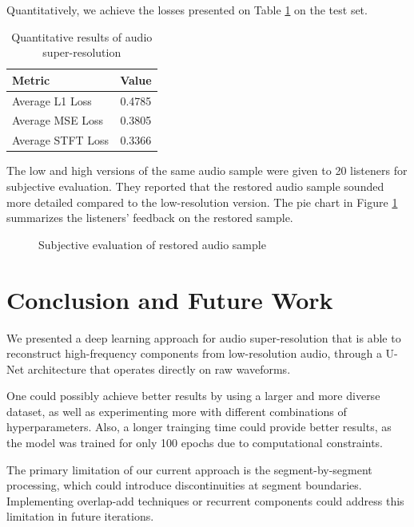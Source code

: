\documentclass{article}
\begin{document}
Quantitatively, we achieve the losses presented on Table \ref{tab:results} on the test set.

\begin{table}[!htb]
    \centering
    \begin{tabular}{lc}
        \toprule
        \textbf{Metric} & \textbf{Value} \\
        \midrule
        Average L1 Loss & 0.4785 \\
        Average MSE Loss & 0.3805 \\
        Average STFT Loss & 0.3366 \\
        \bottomrule
    \end{tabular}
    \caption{Quantitative results of audio super-resolution}
    \label{tab:results}
\end{table}

The low and high versions of the same audio sample were given to 20 listeners for subjective evaluation.
They reported that the restored audio sample sounded more detailed compared to the low-resolution version.
The pie chart in Figure \ref{fig:qualitative} summarizes the listeners' feedback on the restored sample.

\begin{figure}[!htb]
    \centering
    \caption{Subjective evaluation of restored audio sample}
    \label{fig:qualitative}
\end{figure}

\section{Conclusion and Future Work}

We presented a deep learning approach for audio super-resolution that is able to reconstruct high-frequency components from low-resolution audio, through a U-Net architecture that operates directly on raw waveforms.

One could possibly achieve better results by using a larger and more diverse dataset, as well as experimenting more with different combinations of hyperparameters.
Also, a longer trainging time could provide better results, as the model was trained for only 100 epochs due to computational constraints.

The primary limitation of our current approach is the segment-by-segment processing, which could introduce discontinuities at segment boundaries.
Implementing overlap-add techniques or recurrent components could address this limitation in future iterations.



\end{document}
